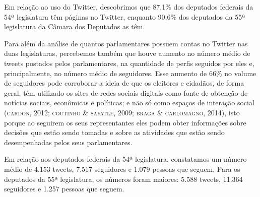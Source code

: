 Em relação ao uso do Twitter, descobrimos que 87,1\% dos deputados federais da 54ª legislatura têm páginas no Twitter, enquanto 90,6\% dos deputados da 55ª legislatura da Câmara dos Deputados as têm.




Para além da análise de quantos parlamentares possuem contas no Twitter
nas duas legislaturas, percebemos também que houve aumento no número
médio de tweets postados pelos parlamentares, na quantidade de perfis
seguidos por eles e, principalmente, no número médio de seguidores.
Esse aumento de 66\% no volume de seguidores pode
corroborar a ideia de que os eleitores e cidadãos, de forma geral, têm
utilizado os sites de redes sociais digitais como fonte de obtenção de
notícias sociais, econômicas e políticas; e não só como espaços de
interação social (\textsc{cardon}, 2012; \textsc{coutinho \& safatle}, 2009; \textsc{braga \&
carlomagno}, 2014), isto porque ao seguirem os seus representantes eles
podem obter informações sobre decisões que estão sendo tomadas e sobre
as atividades que estão sendo desempenhadas pelos seus parlamentares.

Em relação aos deputados federais da 54ª legislatura, constatamos um número médio de 4.153 tweets, 7.517 seguidores e 1.079 pessoas que seguem.
Para os deputados da 55ª legislatura, os números foram maiores: 5.588 tweets, 11.364 seguidores e 1.257 pessoas que seguem.




